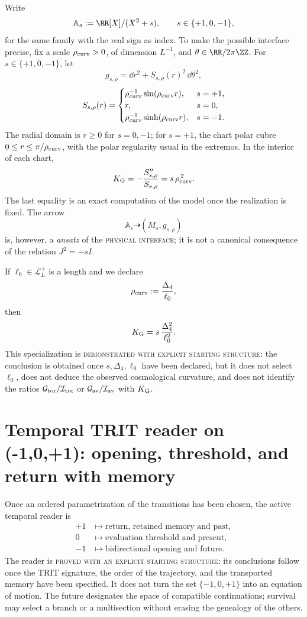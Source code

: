 Write
\[
 \mathbb A_s:=\RR[X]/(X^2+s),
 \qquad s\in\{+1,0,-1\},
\]
for the same family with the real sign as index.
To make the possible interface precise, fix a scale
\(\rho_{\rm curv}>0\), of dimension \(L^{-1}\), and
\(\theta\in\RR/2\pi\ZZ\). For \(s\in\{+1,0,-1\}\), let
\[
 g_{s,\rho}
 =\dd r^2+S_{s,\rho}(r)^2\,\dd\theta^2,
\]
\[
 S_{s,\rho}(r)=
 \begin{cases}
  \rho_{\rm curv}^{-1}\sin(\rho_{\rm curv}r),&s=+1,\\
  r,&s=0,\\
  \rho_{\rm curv}^{-1}\sinh(\rho_{\rm curv}r),&s=-1.
 \end{cases}
\]
The radial domain is \(r\geq0\) for \(s=0,-1\); for \(s=+1\), the chart
polar cubre \(0\leq r\leq\pi/\rho_{\rm curv}\), with the polar regularity
usual in the extremos. In the interior of each chart,
\[
 K_{\rm G}
 =-\frac{S_{s,\rho}''}{S_{s,\rho}}
 =s\,\rho_{\rm curv}^{\,2}.
\]
The last equality is an exact computation of the model once the realization is fixed. The arrow
\[
 \mathbb A_s\dashrightarrow(M_s,g_{s,\rho})
\]
is, however, a \emph{ansatz} of the \textsc{physical interface}; it is not a
canonical consequence of the relation \(J^2=-sI\).

If \(\ell_0\in\mathcal L_L^+\) is a length and we declare
\[
 \rho_{\rm curv}:=\frac{\Delta_4}{\ell_0},
\]
then
\[
 K_{\rm G}
 =s\,\frac{\Delta_4^2}{\ell_0^2}.
\]
This specialization is
\textsc{demonstrated with explicit starting structure}: the conclusion is
obtained once \(s,\Delta_4,\ell_0\) have been declared, but it does not select
\(\ell_0\), does not
deduce the observed cosmological curvature, and does not identify the ratios
\(\mathcal G_{\rm tor}/\mathcal I_{\rm tor}\) or
\(\mathcal G_{\rm av}/\mathcal I_{\rm av}\) with \(K_{\rm G}\).

\section{Temporal TRIT reader on ({-1,0,+1}): opening, threshold, and return with memory}
\label{sec:lector-temporal-trit}

Once an ordered parametrization of the transitions has been chosen, the active
temporal reader is
\[
\begin{aligned}
 +1&\longmapsto
 \text{return, retained memory and past},\\
 0&\longmapsto
 \text{evaluation threshold and present},\\
 -1&\longmapsto
 \text{bidirectional opening and future}.
\end{aligned}
\]
The reader is \textsc{proved with an explicit starting structure}: its
conclusions follow once the TRIT signature, the order of the
trajectory, and the transported memory have been specified. It does not turn the set
\(\{-1,0,+1\}\) into an equation of motion. The future designates the space
of compatible continuations; survival may select a branch
or a multisection without erasing the genealogy of the others.

